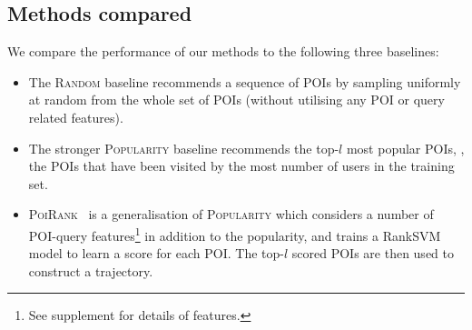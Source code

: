 

\secmoveup
\subsection{Methods compared}
\label{ssec:methods}
\textmoveup

We compare the performance of our methods to the following three baselines:
\begin{itemize}[leftmargin=0.125in]\itemmoveup
\parskip -.05em
\item The \textsc{Random} baseline recommends a sequence of POIs by sampling uniformly at random from the whole set of POIs 
      (without utilising any POI or query related features).

\item The stronger \textsc{Popularity} baseline recommends the top-$l$ most popular POIs, 
      \ie, the POIs that have been visited by the most number of users in the training set.

\item \textsc{PoiRank}~\cite{cikm16paper} is a generalisation of \textsc{Popularity} 
      which considers a number of POI-query features\footnote{See supplement for details of features.\label{fn:suplement}} in addition to the popularity,
      and trains a RankSVM model to learn a score for each POI. The top-$l$ scored POIs are then used to construct a trajectory.
\end{itemize}\itemmoveup

